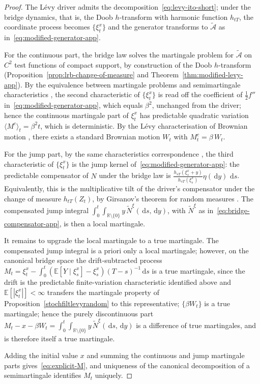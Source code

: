 \documentclass{article}
\newcommand{\levy}{{L\'evy }}
\def\R{\mathbb{R}}
\def\E{\mathbb{E}}
\def\d{\,\mathrm{d}}
\def\half{\frac{1}{2}}
\theoremstyle{definition}
\begin{document}
\begin{proof}
The \levy driver admits the decomposition~\eqref{eq:levy-ito-short}; under the bridge dynamics, that is, the Doob $h$-transform with harmonic function $h_{tT}$, the coordinate process becomes $\{\xi^{x}_t\}$ and the generator transforms to $\widetilde{\mathcal{A}}$ as in~\eqref{eq:modified-generator-app}.

For the continuous part, the bridge law solves the martingale problem for $\widetilde{\mathcal{A}}$ on $C^2$ test functions of compact support, by construction of the Doob $h$-transform (Proposition~\ref{prop:lrb-change-of-measure} and Theorem~\ref{thm:modified-levy-app}). By the equivalence between martingale problems and semimartingale characteristics \cite[Theorem~II.2.42]{JacodShiryaev2003}, the second characteristic of $\{\xi^{x}_t\}$ is read off the coefficient of $\half f''$ in~\eqref{eq:modified-generator-app}, which equals $\beta^2$, unchanged from the driver; hence the continuous martingale part of $\xi^{x}_t$ has predictable quadratic variation $\langle M^c \rangle_t = \beta^2 t$, which is deterministic. By the \levy characterisation of Brownian motion \cite[Theorem~3.3.16]{KaratzasShreve1998}, there exists a standard Brownian motion $W_t$ with $M_t^c = \beta\,W_t$.

For the jump part, by the same characteristics correspondence \cite[Theorem~II.2.42]{JacodShiryaev2003}, the third characteristic of $\{\xi^{x}_t\}$ is the jump kernel of~\eqref{eq:modified-generator-app}: the predictable compensator of $N$ under the bridge law is $\frac{h_{sT}(\xi^{x}_s + y)}{h_{sT}(\xi^{x}_s)}\eta(\d y)\,\d s$. Equivalently, this is the multiplicative tilt of the driver's compensator under the change of measure $h_{tT}(Z_t)$, by Girsanov's theorem for random measures \cite[Theorem~III.3.24]{JacodShiryaev2003}. The compensated jump integral $\int_0^t\!\int_{\R\setminus\{0\}} y\,\widetilde{N}^{\xi}(\d s, \d y)$, with $\widetilde{N}^{\xi}$ as in~\eqref{eq:bridge-compensator-app}, is then a local martingale.

It remains to upgrade the local martingale to a true martingale. The compensated jump integral is a priori only a local martingale; however, on the canonical bridge space the drift-subtracted process $M_t = \xi^x_t - \int_0^t (\E[Y \mid \xi^x_s] - \xi^x_s)(T-s)^{-1} \d s$ is a true martingale, since the drift is the predictable finite-variation characteristic identified above and $\E[|\xi^x_t|] < \infty$ transfers the martingale property of Proposition~\ref{stochfiltlevyrandom} to this representative; $\{\beta W_t\}$ is a true martingale; hence the purely discontinuous part $M_t - x - \beta W_t = \int_0^t\!\int_{\R\setminus\{0\}} y\,\widetilde{N}^{\xi}(\d s, \d y)$ is a difference of true martingales, and is therefore itself a true martingale.

Adding the initial value $x$ and summing the continuous and jump martingale parts gives~\eqref{eq:explicit-M}, and uniqueness of the canonical decomposition of a semimartingale \cite[Chapter~II, Theorem 2.4.2]{JacodShiryaev2003} identifies $M_t$ uniquely.
\end{proof}
\end{document}
